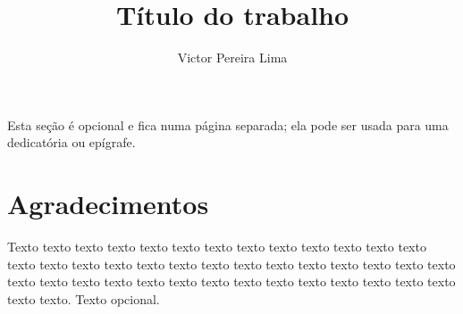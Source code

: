 \documentclass[a4paper,12pt,twoside,english,brazilian]{book}
\title{Título do trabalho}[um subtítulo]
\author[masc]{Victor Pereira Lima}
\begin{document}

\frontmatter

\pagestyle{plain}

\onehalfspacing %

\maketitle %


\begin{dedicatoria}
Esta seção é opcional e fica numa página separada; ela pode ser usada para
uma dedicatória ou epígrafe.
\end{dedicatoria}


\chapter*{Agradecimentos}

Texto texto texto texto texto texto texto texto texto texto texto texto texto
texto texto texto texto texto texto texto texto texto texto texto texto texto
texto texto texto texto texto texto texto texto texto texto texto texto texto
texto texto texto texto. Texto opcional.




\end{document}
